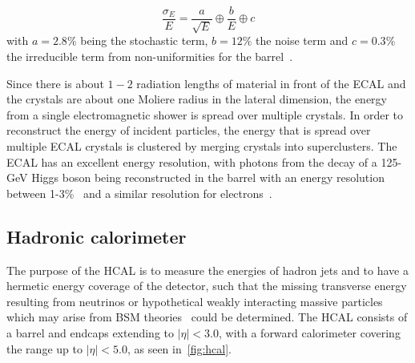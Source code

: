 \begin{equation}
\frac{\sigma_E}{E} = \frac{a}{\sqrt{E}} \oplus \frac{b}{E} \oplus c
\end{equation}
with $a = 2.8\%$ being the stochastic term, $b = 12\%$ the noise term and $c = 0.3\%$ the irreducible term from non-uniformities for the barrel~\cite{Adzic:2007mi}.

Since there is about $1-2$ radiation lengths of material in front of the ECAL and the crystals are about one Moliere radius in the lateral dimension, the energy from a single electromagnetic shower is spread over multiple crystals. In order to reconstruct the energy of incident particles, the energy that is spread over multiple ECAL crystals is clustered by merging crystals into superclusters. The ECAL has an excellent energy resolution, with photons from the decay of a 125-GeV Higgs boson being reconstructed in the barrel with an energy resolution between 1-3\%~\cite{Chatrchyan:2013dga} and a similar resolution for electrons~\cite{Khachatryan:2015hwa}.

\subsection{Hadronic calorimeter}
The purpose of the HCAL is to measure the energies of hadron jets and to have a hermetic energy coverage of the detector, such that the missing transverse energy resulting from neutrinos or hypothetical weakly interacting massive particles which may arise from BSM theories~\cite{Jungman:1995df} could be determined. The HCAL consists of a barrel and endcaps extending to $|\eta| < 3.0$, with a forward calorimeter covering the range up to $|\eta|<5.0$, as seen in~\cref{fig:hcal}.

